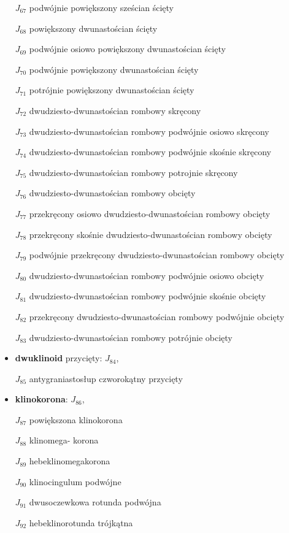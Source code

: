 \begin{itemize}
    \item [$J_{67}$] {podwójnie powiększony sześcian ścięty}
    \item [$J_{68}$] {powiększony dwunastościan ścięty}
    \item [$J_{69}$] {podwójnie osiowo powiększony dwunastościan ścięty}
    \item [$J_{70}$] {podwójnie powiększony dwunastościan ścięty}
    \item [$J_{71}$] {potrójnie powiększony dwunastościan ścięty}
    \item [$J_{72}$] {dwudziesto-dwunastościan rombowy skręcony}
    \item [$J_{73}$] {dwudziesto-dwunastościan rombowy podwójnie osiowo skręcony}
    \item [$J_{74}$] {dwudziesto-dwunastościan rombowy podwójnie skośnie skręcony}
    \item [$J_{75}$] {dwudziesto-dwunastościan rombowy potrojnie skręcony}
    \item [$J_{76}$] {dwudziesto-dwunastościan rombowy obcięty}
    \item [$J_{77}$] {przekręcony osiowo dwudziesto-dwunastościan rombowy obcięty}
    \item [$J_{78}$] {przekręcony skośnie dwudziesto-dwunastościan rombowy obcięty}
    \item [$J_{79}$] {podwójnie przekręcony dwudziesto-dwunastościan rombowy obcięty}
    \item [$J_{80}$] {dwudziesto-dwunastościan rombowy podwójnie osiowo obcięty}
    \item [$J_{81}$] {dwudziesto-dwunastościan rombowy podwójnie skośnie obcięty}
    \item [$J_{82}$] {przekręcony dwudziesto-dwunastościan rombowy podwójnie obcięty}
    \item [$J_{83}$] {dwudziesto-dwunastościan rombowy potrójnie obcięty}
    \item {\textbf{dwuklinoid} przycięty: $J_{84}$,}
    \item [$J_{85}$] {antygraniastosłup czworokątny przycięty}
    \item {\textbf{klinokorona}}: $J_{86}$,
    \item [$J_{87}$] {powiększona klinokorona}
    \item [$J_{88}$] {klinomega- korona}
    \item [$J_{89}$] {hebeklinomegakorona}
    \item [$J_{90}$] {klinocingulum podwójne}
    \item [$J_{91}$] {dwusoczewkowa rotunda podwójna}
    \item [$J_{92}$] {hebeklinorotunda trójkątna}
\end{itemize}